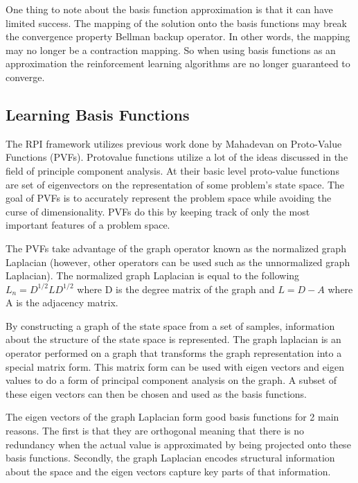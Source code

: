 \documentclass[12pt, letterpaper, final]{report}
\begin{document}
One thing to note about the basis function approximation is that it
 can have limited success. The mapping of
the solution onto the basis functions may break the convergence property Bellman backup
operator. In other words, the mapping may no longer be a contraction
mapping. So when using basis functions as an approximation the
reinforcement learning algorithms are no longer guaranteed to converge.

\subsection*{Learning Basis Functions}

The RPI framework utilizes previous work done by
Mahadevan\cite{sridhar_mahadevan_proto-value_????} \cite{sridhar_mahadevan_representation_????} on Proto-Value Functions (PVFs). Protovalue functions utilize a
lot of the ideas discussed in the field of principle component
analysis. At their basic level proto-value functions are set of
eigenvectors on the representation of some problem's state space. The
goal of PVFs is to accurately represent the problem space while
avoiding the curse of dimensionality. PVFs do this by keeping track of
only the most important features of a problem space.

The PVFs take advantage of the graph operator known as the normalized
graph Laplacian (however, other operators can be
used such as the unnormalized graph Laplacian). The normalized graph
Laplacian is equal to the following $L_n = D^{1/2}LD^{1/2}$ where D is
the degree matrix of the graph and $L=D - A$ where A is the adjacency
matrix. 

By constructing a graph of the state space from a set of
samples, information about the structure of the state space is
represented. The graph laplacian is an operator performed on a
graph that transforms the graph representation into a special matrix
form. This matrix form can be used with eigen vectors and eigen values
to do a form of principal component analysis on the graph. A subset of
these eigen vectors can then be chosen and used as the basis functions.

The eigen vectors of the graph Laplacian form good basis functions for
2 main reasons. The first is that they are orthogonal meaning that
there is no redundancy when the actual value is approximated by being
projected onto these basis functions. Secondly, the graph Laplacian
encodes structural information about the space and the eigen vectors
capture key parts of that information.
\end{document}
